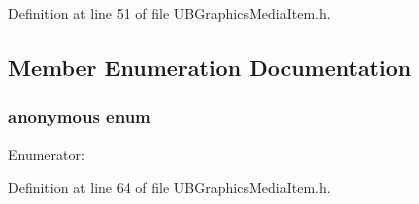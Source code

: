 Definition at line 51 of file U\-B\-Graphics\-Media\-Item.\-h.



\subsection{Member Enumeration Documentation}
\hypertarget{class_u_b_graphics_media_item_a940b930449b3aaf6cd9be3639d8d19f2}{\subsubsection[{anonymous enum}]{\setlength{\rightskip}{0pt plus 5cm}anonymous enum}}\label{dc/d5a/class_u_b_graphics_media_item_a940b930449b3aaf6cd9be3639d8d19f2}
\begin{Desc}
\item[Enumerator\-: ]\par
\begin{description}
\item[{\em 
\hypertarget{class_u_b_graphics_media_item_a940b930449b3aaf6cd9be3639d8d19f2a1694a0279d66b57a1604aba2a2921781}{Type}\label{dc/d5a/class_u_b_graphics_media_item_a940b930449b3aaf6cd9be3639d8d19f2a1694a0279d66b57a1604aba2a2921781}
}]\end{description}
\end{Desc}



Definition at line 64 of file U\-B\-Graphics\-Media\-Item.\-h.

